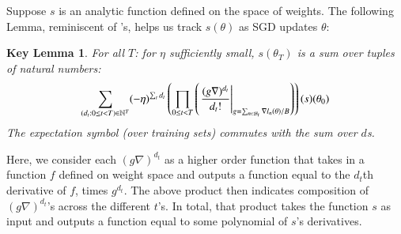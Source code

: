 \documentclass[openany, notitlepage, justified]{tufte-book}
\theoremstyle{plain}
\newtheorem*{klem*}{Key Lemma}
\theoremstyle{definition}
\newcommand{\wrap}[1]{\left(#1\right)}
\newcommand{\Bb}{\mathcal{B}}
\begin{document}
        Suppose $s$ is an analytic function defined on the space of weights.
        The following Lemma, reminiscent of \citet{dy49a}'s, helps us track
        $s(\theta)$ as SGD updates $\theta$:
        \begin{klem*} \label{lem:dyson}
            For all $T$: for $\eta$ sufficiently small, $s(\theta_T)$ is a sum
            over tuples of natural numbers:
            \begin{equation}\label{eq:dyson}
                \sum_{(d_t: 0\leq t<T) \in \NN^T}
                (-\eta)^{\sum_t d_t}
                \wrap{
                    \prod_{0 \leq t < T}
                        \wrap{\left.
                            \frac{(g \nabla)^{d_t}}{d_t!}
                        \right|_{g = \sum_{n\in \Bb_t} \nabla l_n(\theta) / B}}
                }(s) (\theta_0)
            \end{equation}
            The expectation symbol (over training sets) commutes with the sum
            over $d$s.
        \end{klem*}
        Here, we consider each $(g \nabla)^{d_t}$ as a higher order function
        that takes in a function $f$ defined on weight space and outputs a
        function equal to the $d_t$th derivative of $f$, times $g^{d_t}$.
        The above product then indicates composition of $(g \nabla)^{d_t}$'s
        across the different $t$'s.  In total, that product takes the function
        $s$ as input and outputs a function equal to some polynomial of $s$'s
        derivatives.
\end{document}
